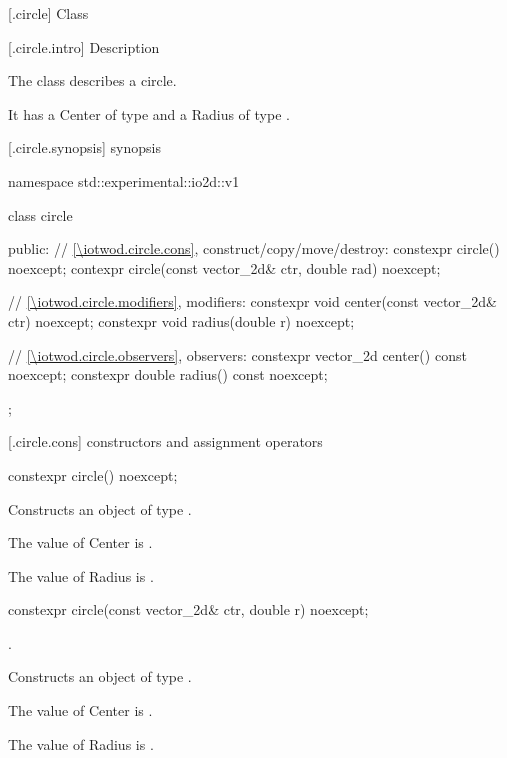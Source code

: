  [\iotwod.circle] {Class }

 [\iotwod.circle.intro] { Description}

\pnum
{}
The class  describes a circle.

\pnum
It has a Center of type  and a Radius of type .

 [\iotwod.circle.synopsis] { synopsis}

\begin{codeblock}
namespace std::experimental::io2d::v1 {
  class circle {
  public:
    // \ref{\iotwod.circle.cons}, construct/copy/move/destroy:
    constexpr circle() noexcept;
    contexpr circle(const vector_2d& ctr, double rad) noexcept;

    // \ref{\iotwod.circle.modifiers}, modifiers:
    constexpr void center(const vector_2d& ctr) noexcept;
    constexpr void radius(double r) noexcept;
    
    // \ref{\iotwod.circle.observers}, observers:
    constexpr vector_2d center() const noexcept;
    constexpr double radius() const noexcept;
  };
}
\end{codeblock}

 [\iotwod.circle.cons] { constructors and assignment operators}

\begin{itemdecl}
constexpr circle() noexcept;
\end{itemdecl}
\begin{itemdescr}
\pnum
\effects
Constructs an object of type .

\pnum
The value of Center is .

\pnum
The value of Radius is .
\end{itemdescr}

\begin{itemdecl}
constexpr circle(const vector_2d& ctr, double r) noexcept;
\end{itemdecl}
\begin{itemdescr}
\requires
{}.

\pnum
\effects
Constructs an object of type .

\pnum
The value of Center is .

\pnum
The value of Radius is .
\end{itemdescr}

